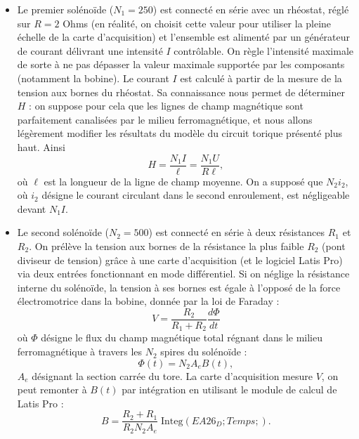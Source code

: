 \documentclass[11pt,a4paper]{report}
\begin{document}
\begin{itemize}
	\item Le premier solénoïde ($N_1 = 250$) est connecté en série avec un rhéostat, réglé sur $R = 2$ Ohms (en réalité, on choisit cette valeur pour utiliser la pleine échelle de la carte d'acquisition) et l'ensemble est alimenté par un générateur de courant délivrant une intensité $I$ contrôlable. On règle l'intensité maximale de sorte à ne pas dépasser la valeur maximale supportée par les composants (notamment la bobine). Le courant $I$ est calculé à partir de la mesure de la tension aux bornes du rhéostat. Sa connaissance nous permet de déterminer $H$ : on suppose pour cela que les lignes de champ magnétique sont parfaitement canalisées par le milieu ferromagnétique, et nous allons légèrement modifier les résultats du modèle du circuit torique présenté plus haut. Ainsi
\begin{equation}
	H = \frac{N_1 I}{\ell} = \frac{N_1 U}{R\ell},
\end{equation}
où $\ell$ est la longueur de la ligne de champ moyenne. On a supposé que $N_2 i_2$, où $i_2$ désigne le courant circulant dans le second enroulement, est négligeable devant $N_1 I$.\\

	\item Le second solénoïde ($N_2 = 500$) est connecté en série à deux résistances $R_1$ et $R_2$. On prélève la tension aux bornes de la résistance la plus faible $R_2$ (pont diviseur de tension) grâce à une carte d'acquisition (et le logiciel Latis Pro) via deux entrées fonctionnant en mode différentiel. Si on néglige la résistance interne du solénoïde, la tension à ses bornes est égale à l'opposé de la force électromotrice dans la bobine, donnée par la loi de Faraday :
\begin{equation}
	V = \frac{R_2}{R_1 + R_2} \frac{d\Phi}{dt}
\end{equation}
où $\Phi$ désigne le flux du champ magnétique total régnant dans le milieu ferromagnétique à travers les $N_2$ spires du solénoïde :
\begin{equation}
	\Phi(t) = N_2 A_e B(t),
\end{equation}
$A_e$ désignant la section carrée du tore. La carte d'acquisition mesure $V$, on peut remonter à $B(t)$ par intégration en utilisant le module de calcul de Latis Pro :
\begin{equation}
	B = \frac{R_2 + R_1}{R_2 N_2 A_e}\;\text{Integ}(EA26_D;Temps;).
\end{equation}
\end{itemize}
\end{document}
